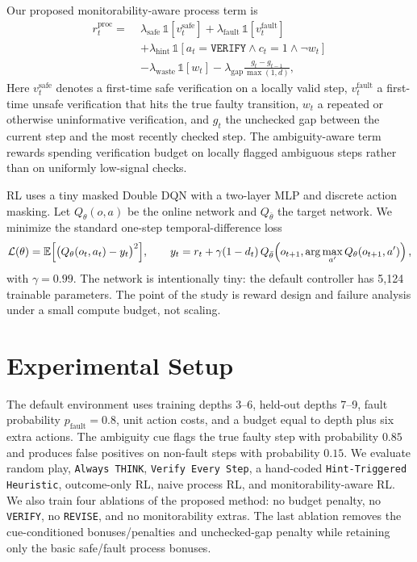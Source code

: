 \documentclass{article}
\begin{document}
Our proposed monitorability-aware process term is
\begin{equation}
\begin{aligned}
r_t^{\mathrm{proc}}
=\;& \lambda_{\mathrm{safe}} \,\mathbb{1}[v_t^{\mathrm{safe}}]
+ \lambda_{\mathrm{fault}} \,\mathbb{1}[v_t^{\mathrm{fault}}] \\
& + \lambda_{\mathrm{hint}} \,\mathbb{1}[a_t=\texttt{VERIFY} \wedge c_t = 1 \wedge \neg w_t] \\
& - \lambda_{\mathrm{waste}} \,\mathbb{1}[w_t]
- \lambda_{\mathrm{gap}} \frac{g_t - g_{t-1}}{\max(1,d)},
\end{aligned}
\label{eq:monitorability}
\end{equation}
Here $v_t^{\mathrm{safe}}$ denotes a first-time safe verification on a locally valid step, $v_t^{\mathrm{fault}}$ a first-time unsafe verification that hits the true faulty transition, $w_t$ a repeated or otherwise uninformative verification, and $g_t$ the unchecked gap between the current step and the most recently checked step. The ambiguity-aware term rewards spending verification budget on locally flagged ambiguous steps rather than on uniformly low-signal checks.

RL uses a tiny masked Double DQN with a two-layer MLP and discrete action masking. Let $Q_{\theta}(o,a)$ be the online network and $Q_{\bar{\theta}}$ the target network. We minimize the standard one-step temporal-difference loss
\begin{equation}
\mathcal{L}(\theta)
= \mathbb{E}\Bigl[\bigl(Q_{\theta}(o_t,a_t) - y_t\bigr)^2\Bigr],
\qquad
y_t = r_t + \gamma (1-d_t)\, Q_{\bar{\theta}}\!\left(o_{t+1}, \arg\max_{a'} Q_{\theta}(o_{t+1},a')\right),
\label{eq:dqn}
\end{equation}
with $\gamma=0.99$. The network is intentionally tiny: the default controller has 5,124 trainable parameters. The point of the study is reward design and failure analysis under a small compute budget, not scaling.

\section{Experimental Setup}
The default environment uses training depths 3--6, held-out depths 7--9, fault probability $p_{\mathrm{fault}}=0.8$, unit action costs, and a budget equal to depth plus six extra actions. The ambiguity cue flags the true faulty step with probability $0.85$ and produces false positives on non-fault steps with probability $0.15$. We evaluate random play, \texttt{Always THINK}, \texttt{Verify Every Step}, a hand-coded \texttt{Hint-Triggered Heuristic}, outcome-only RL, naive process RL, and monitorability-aware RL. We also train four ablations of the proposed method: no budget penalty, no \texttt{VERIFY}, no \texttt{REVISE}, and no monitorability extras. The last ablation removes the cue-conditioned bonuses/penalties and unchecked-gap penalty while retaining only the basic safe/fault process bonuses.
\end{document}
